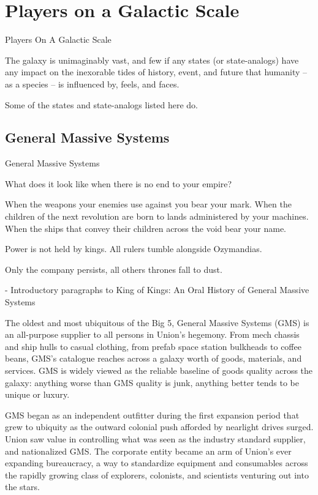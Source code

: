 \section{Players on a Galactic Scale}

Players On A Galactic Scale  

The galaxy is unimaginably vast, and few if any states (or state-analogs) have any  
impact on the inexorable tides of history, event, and future that humanity -- as a species -- is  
influenced by, feels, and faces.   

Some of the states and state-analogs listed here do.    
\subsection{General Massive Systems}
General Massive Systems  

         What does it look like when there is no end to your empire?   

         When the weapons your enemies use against you bear your mark. When the children of  
         the next revolution are born to lands administered by your machines. When the ships that  
         convey their children across the void bear your name.   

         Power is not held by kings. All rulers tumble alongside Ozymandias.   

         Only the company persists, all others thrones fall to dust.      

             -   Introductory paragraphs to King of Kings: An Oral History of General Massive  
                 Systems  

The oldest and most ubiquitous of the Big 5, General Massive Systems (GMS) is an all-purpose  
supplier to all persons in Union’s hegemony. From mech chassis and ship hulls to casual clothing,  
from prefab space station bulkheads to coffee beans, GMS’s catalogue reaches across a galaxy  
worth of goods, materials, and services. GMS is widely viewed as the reliable baseline of goods  
quality across the galaxy: anything worse than GMS quality is junk, anything better tends to be  
unique or luxury.   

GMS began as an independent outfitter during the first expansion period that grew to ubiquity as  
the outward colonial push afforded by nearlight drives surged. Union saw value in controlling what  
was seen as the industry standard supplier, and nationalized GMS. The corporate entity became  
an arm of Union’s ever expanding bureaucracy, a way to standardize equipment and  
consumables across the rapidly growing class of explorers, colonists, and scientists venturing out  
into the stars.   


